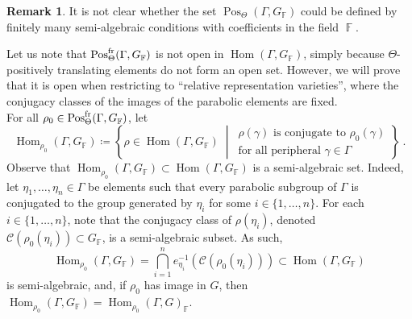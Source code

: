 \documentclass{amsart}
\theoremstyle{plain}
\theoremstyle{definition}
\newtheorem{remark}[proposition]{Remark}
\DeclareMathOperator{\Hom}{Hom}
\DeclareMathOperator{\Pos}{Pos}
\DeclareMathOperator{\Fb}{{\mathbb{F}}}
\newcommand{\fr}{\textnormal{fr}}
\newcommand{\1}{\mathbf{1}}
\begin{document}
\begin{remark}
    It is not clear whether the set $\Pos_\Theta(\Gamma,G_{\Fb})$ could be defined by finitely many semi-algebraic conditions with coefficients in the field $\Fb$.
\end{remark}

Let us note that $\Pos_\Theta^{\fr}(\Gamma,G_{\Fb})$ is not open in $\Hom(\Gamma,G_{\Fb})$, simply because $\Theta$-positively translating elements do not form an open set. 
However, we will prove that it is open when restricting to ``relative representation varieties'', where the conjugacy classes of the images of the parabolic elements are fixed.\\


For all $\rho_0\in\Pos_\Theta^{\fr}(\Gamma,G_{\Fb})$, let 
\[\Hom_{\rho_0}(\Gamma,G_{\Fb}) \coloneqq \left\{\rho\in \Hom(\Gamma,G_{\Fb}) \;\middle\vert\, \begin{array}{l}\rho(\gamma) \textrm{ is conjugate to }\rho_0(\gamma)\\
\text{for all peripheral }\gamma\in\Gamma
\end{array}\right\}~.\]
Observe that $\Hom_{\rho_0}(\Gamma,G_{\Fb})\subset \Hom(\Gamma,G_{\Fb})$ is a semi-algebraic set. Indeed, let $\eta_1,\dots,\eta_n\in \Gamma$ be elements such that every parabolic subgroup of $\Gamma$ is conjugated to the group generated by $\eta_i$ for some $i\in\{1,\dots,n\}$. For each $i\in\{1,\dots,n\}$, note that the conjugacy class of $\rho(\eta_i)$, denoted $\mathcal C(\rho_0(\eta_i))\subset G_{\Fb}$, is a semi-algebraic subset. As such,
\[\Hom_{\rho_0}(\Gamma,G_{\Fb})=\bigcap_{i=1}^ne_{\eta_i}^{-1}(\mathcal C(\rho_0(\eta_i)))\subset \Hom(\Gamma,G_{\Fb})\]
is semi-algebraic, and, if $\rho_0$ has image in $G$, then $\Hom_{\rho_0}(\Gamma,G_{\Fb})=\Hom_{\rho_0}(\Gamma,G)_{\Fb}$.
\end{document}
